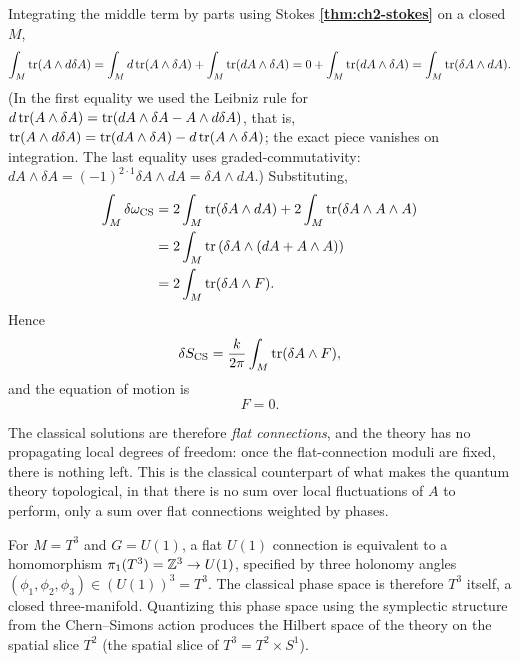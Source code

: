 \medskip

\noindent Integrating the middle term by parts using Stokes \textbf{\ref{thm:ch2-stokes}} on a closed $M$,
\begin{align*}
\int_M \operatorname{tr}(A\wedge d\delta A) = \int_M d\operatorname{tr}(A\wedge \delta A) + \int_M \operatorname{tr}(dA \wedge \delta A) = 0 + \int_M \operatorname{tr}(dA\wedge \delta A) = \int_M \operatorname{tr}(\delta A\wedge dA).
\end{align*}
(In the first equality we used the Leibniz rule for $d\operatorname{tr}(A\wedge\delta A) = \operatorname{tr}(dA\wedge\delta A - A\wedge d\delta A)$, that is, $\operatorname{tr}(A\wedge d\delta A) = \operatorname{tr}(dA\wedge\delta A) - d\operatorname{tr}(A\wedge\delta A)$; the exact piece vanishes on integration. The last equality uses graded-commutativity: $dA\wedge\delta A = (-1)^{2\cdot 1}\delta A\wedge dA = \delta A\wedge dA$.) Substituting,
\begin{align*}
\int_M \delta\omega_{\operatorname{CS}} &= 2\int_M \operatorname{tr}(\delta A\wedge dA) + 2\int_M \operatorname{tr}(\delta A\wedge A\wedge A) \\
&= 2\int_M \operatorname{tr}\left(\delta A\wedge (dA + A\wedge A)\right) \\
&= 2\int_M \operatorname{tr}(\delta A\wedge F).
\end{align*}
Hence
\begin{equation}\label{eq:deltaS}
\delta S_{\operatorname{CS}} = \frac{k}{2\pi}\int_M \operatorname{tr}(\delta A\wedge F),
\end{equation}
and the equation of motion is
\begin{equation}\label{eq:EOM}
F = 0.
\end{equation}

\noindent The classical solutions are therefore \emph{flat connections}, and the theory has no propagating local degrees of freedom: once the flat-connection moduli are fixed, there is nothing left. This is the classical counterpart of what makes the quantum theory topological, in that there is no sum over local fluctuations of $A$ to perform, only a sum over flat connections weighted by phases.

\begin{example}\label{ex:flat-torus}
For $M = T^3$ and $G = U(1)$, a flat $U(1)$ connection is equivalent to a homomorphism $\pi_1(T^3) = \mathbb{Z}^3 \to U(1)$, specified by three holonomy angles $(\phi_1,\phi_2,\phi_3)\in (U(1))^3 = T^3$. The classical phase space is therefore $T^3$ itself, a closed three-manifold. Quantizing this phase space using the symplectic structure from the Chern--Simons action produces the Hilbert space of the theory on the spatial slice $T^2$ (the spatial slice of $T^3 = T^2\times S^1$).
\end{example}

